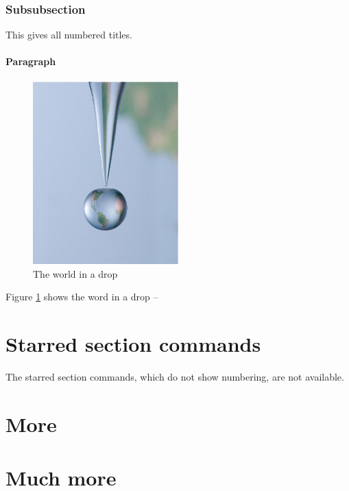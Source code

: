 \documentclass[fleqn,twoside,10pt]{article}
\begin{document}
\subsubsection{Subsubsection}
This gives all numbered titles. \cite{Reference2015}

\paragraph{Paragraph}
\begin{figure}
  \includegraphics[width=0.5\textwidth]{F_drop.eps}
  \caption{The world in a drop}
  \label{Fig:drop}
\end{figure}
Figure \ref{Fig:drop} shows the word in a drop -- 

\section{Starred section commands}
The starred section commands, which do not show numbering, are not available.

\section{More}
\blindtext[2]

\section{Much more}
\blindtext[3]



{\small\bibsep=0pt

}
\end{document}
